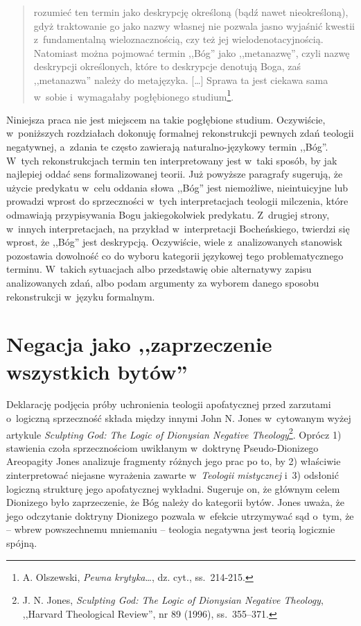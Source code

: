 \begin{quote}
rozumieć ten termin jako deskrypcję określoną (bądź nawet nieokreśloną), gdyż traktowanie go jako nazwy własnej nie pozwala jasno wyjaśnić kwestii z~fundamentalną wieloznacznością, czy też jej wielodenotacyjnością. Natomiast można pojmować termin ,,Bóg'' jako ,,metanazwę'', czyli nazwę deskrypcji określonych, które to deskrypcje denotują Boga, zaś ,,metanazwa'' należy do metajęzyka. [\ldots] Sprawa ta jest ciekawa sama w~sobie i~wymagałaby pogłębionego studium\footnote{A. Olszewski, \textit{Pewna krytyka}\ldots, dz. cyt., ss.~214-215.}.
\end{quote}

Niniejsza praca nie jest miejscem na takie pogłębione studium. Oczywiście, w~poniższych rozdziałach dokonuję formalnej rekonstrukcji pewnych zdań teologii negatywnej, a~zdania te często zawierają naturalno-językowy termin ,,Bóg''. W~tych rekonstrukcjach termin ten interpretowany jest w~taki sposób, by jak najlepiej oddać sens formalizowanej teorii. Już powyższe paragrafy sugerują, że użycie predykatu w~celu oddania słowa ,,Bóg'' jest niemożliwe, nieintuicyjne lub prowadzi wprost do sprzeczności w~tych interpretacjach teologii milczenia, które odmawiają przypisywania Bogu jakiegokolwiek predykatu. Z~drugiej strony, w~innych interpretacjach, na przykład w~interpretacji Bocheńskiego, twierdzi się wprost, że ,,Bóg'' jest deskrypcją. Oczywiście, wiele z~analizowanych stanowisk pozostawia dowolność co do wyboru kategorii językowej tego problematycznego terminu. W~takich sytuacjach albo przedstawię obie alternatywy zapisu analizowanych zdań, albo podam argumenty za wyborem danego sposobu rekonstrukcji w~języku formalnym.


\chapter{Negacja jako ,,zaprzeczenie wszystkich bytów''}\label{sil-jones}

Deklarację podjęcia próby uchronienia teologii apofatycznej przed zarzutami o~logiczną sprzeczność składa między innymi John N. Jones w~cytowanym wyżej artykule \textit{Sculpting God: The Logic of Dionysian Negative Theology}\footnote{J. N. Jones, \textit{Sculpting God: The Logic of Dionysian Negative Theology}, ,,Harvard Theological Review'', nr 89 (1996), ss.~355–371.}. Oprócz 1) stawienia czoła sprzecznościom uwikłanym w~doktrynę Pseudo-Dionizego Areopagity Jones analizuje fragmenty różnych jego prac po to, by 2) właściwie zinterpretować niejasne wyrażenia zawarte w~\textit{Teologii mistycznej} i~3) odsłonić logiczną strukturę jego apofatycznej wykładni. Sugeruje on, że głównym celem Dionizego było zaprzeczenie, że Bóg należy do kategorii bytów. Jones uważa, że jego odczytanie doktryny Dionizego pozwala w~efekcie utrzymywać sąd o~tym, że -- wbrew powszechnemu mniemaniu -- teologia negatywna jest teorią logicznie spójną.

